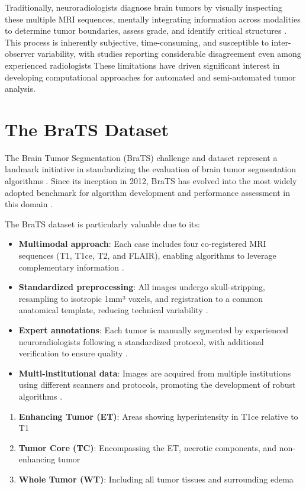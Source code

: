 Traditionally, neuroradiologists diagnose brain tumors by visually inspecting these multiple MRI sequences, mentally integrating information across modalities to determine tumor boundaries, assess grade, and identify critical structures \cite{DeAngelis2001}. This process is inherently subjective, time-consuming, and susceptible to inter-observer variability, with studies reporting considerable disagreement even among experienced radiologists  These limitations have driven significant interest in developing computational approaches for automated and semi-automated tumor analysis.

\section{The BraTS Dataset}

The Brain Tumor Segmentation (BraTS) challenge and dataset represent a landmark initiative in standardizing the evaluation of brain tumor segmentation algorithms \cite{Menze2015, Bakas2018}. Since its inception in 2012, BraTS has evolved into the most widely adopted benchmark for algorithm development and performance assessment in this domain \cite{Bakas2019}.

The BraTS dataset is particularly valuable due to its:

\begin{itemize}
  \item \textbf{Multimodal approach}: Each case includes four co-registered MRI sequences (T1, T1ce, T2, and FLAIR), enabling algorithms to leverage complementary information \cite{Bakas2017}.
  \item \textbf{Standardized preprocessing}: All images undergo skull-stripping, resampling to isotropic 1mm³ voxels, and registration to a common anatomical template, reducing technical variability \cite{Bakas2018}.
  \item \textbf{Expert annotations}: Each tumor is manually segmented by experienced neuroradiologists following a standardized protocol, with additional verification to ensure quality \cite{Menze2015}.
  \item \textbf{Multi-institutional data}: Images are acquired from multiple institutions using different scanners and protocols, promoting the development of robust algorithms \cite{Bakas2019}.
\end{itemize}

\begin{enumerate}
  \item \textbf{Enhancing Tumor (ET)}: Areas showing hyperintensity in T1ce relative to T1
  \item \textbf{Tumor Core (TC)}: Encompassing the ET, necrotic components, and non-enhancing tumor
  \item \textbf{Whole Tumor (WT)}: Including all tumor tissues and surrounding edema
\end{enumerate}

